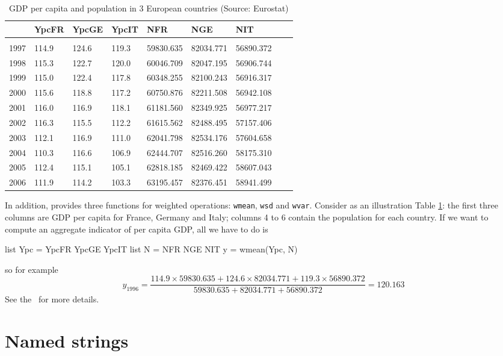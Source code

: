 \begin{table}
  \centering
  \begin{tabular}{lllllllll}
\hline
	& YpcFR & YpcGE	& YpcIT	& NFR		& NGE		& NIT        \\ 
\hline
\\ [-8pt]
1997	& 114.9 & 124.6	& 119.3	& 59830.635	& 82034.771	& 56890.372  \\ 
1998	& 115.3 & 122.7	& 120.0	& 60046.709	& 82047.195	& 56906.744  \\ 
1999	& 115.0	& 122.4	& 117.8	& 60348.255	& 82100.243	& 56916.317  \\ 
2000	& 115.6 & 118.8	& 117.2	& 60750.876	& 82211.508	& 56942.108  \\ 
2001	& 116.0	& 116.9	& 118.1	& 61181.560	& 82349.925	& 56977.217  \\ 
2002	& 116.3 & 115.5	& 112.2	& 61615.562	& 82488.495	& 57157.406  \\ 
2003	& 112.1 & 116.9	& 111.0	& 62041.798	& 82534.176	& 57604.658  \\ 
2004	& 110.3 & 116.6	& 106.9	& 62444.707	& 82516.260	& 58175.310  \\ 
2005	& 112.4 & 115.1	& 105.1	& 62818.185	& 82469.422	& 58607.043  \\ 
2006	& 111.9 & 114.2	& 103.3	& 63195.457	& 82376.451	& 58941.499  \\
\hline
  \end{tabular}
  \caption{GDP per capita and population in 3 European countries (Source: Eurostat)}
  \label{tab:EuroData}
\end{table}
In addition,  provides three functions for weighted
operations: \texttt{wmean}, \texttt{wsd} and \texttt{wvar}. Consider
as an illustration Table \ref{tab:EuroData}: the first three columns are GDP
per capita for France, Germany and Italy; columns 4 to 6 contain the
population for each country. If we want to compute an aggregate
indicator of per capita GDP, all we have to do is
\begin{code}
list Ypc = YpcFR YpcGE YpcIT
list N = NFR NGE NIT
y = wmean(Ypc, N)
\end{code}
so for example
\[
y_{1996} = \frac{114.9 \times 59830.635 + 124.6 \times 82034.771 +
  119.3 \times 56890.372} {59830.635 + 82034.771 + 56890.372} =
120.163
\]
See the \GCR\ for more details.

\section{Named strings}
\label{sec:named-strings}

